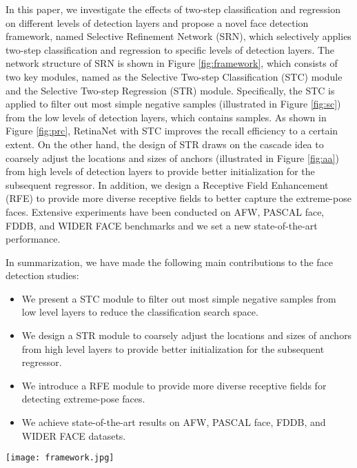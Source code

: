 \documentclass[letterpaper]{article} \usepackage{aaai19m}  \usepackage{times}  \usepackage{helvet}  \usepackage{courier}  \usepackage{url}  \usepackage{graphicx}  \usepackage{subfigure}
\begin{document}
In this paper, we investigate the effects of two-step classification and regression on different levels of detection layers and propose a novel face detection framework, named Selective Refinement Network (SRN), which selectively applies two-step classification and regression to specific levels of detection layers. The network structure of SRN is shown in Figure \ref{fig:framework}, which consists of two key modules, named as the Selective Two-step Classification (STC) module and the Selective Two-step Regression (STR) module. Specifically, the STC is applied to filter out most simple negative samples (illustrated in Figure \ref{fig:sc}) from the low levels of detection layers, which contains  samples. As shown in Figure \ref{fig:prc}, RetinaNet with STC improves the recall efficiency to a certain extent. On the other hand, the design of STR draws on the cascade idea to coarsely adjust the locations and sizes of anchors (illustrated in Figure \ref{fig:aa}) from high levels of detection layers to provide better initialization for the subsequent regressor. In addition, we design a Receptive Field Enhancement (RFE) to provide more diverse receptive fields to better capture the extreme-pose faces. Extensive experiments have been conducted on AFW, PASCAL face, FDDB, and WIDER FACE benchmarks and we set a new state-of-the-art performance.

In summarization, we have made the following main contributions to the face detection studies:
\begin{itemize}
\item We present a STC module to filter out most simple negative samples from low level layers to reduce the classification search space.
\item We design a STR module to coarsely adjust the locations and sizes of anchors from high level layers to provide better initialization for the subsequent regressor.
\item We introduce a RFE module to provide more diverse receptive fields for detecting extreme-pose faces.
\item We achieve state-of-the-art results on AFW, PASCAL face, FDDB, and WIDER FACE datasets.
\end{itemize}

\begin{figure*}[ht!]
\centering
\texttt{[image: framework.jpg]}
\caption{Network structure of SRN. It consists of STC, STR, and RFB. STC uses the first-step classifier to filter out most simple negative anchors from low level detection layers to reduce the search space for the second-step classifier. STR applies the first-step regressor to coarsely adjust the locations and sizes of anchors from high level detection layers to provide better initialization for the second-step regressor. RFE provides more diverse receptive fields to better capture extreme-pose faces.
}
\label{fig:framework}
\end{figure*}
\end{document}
